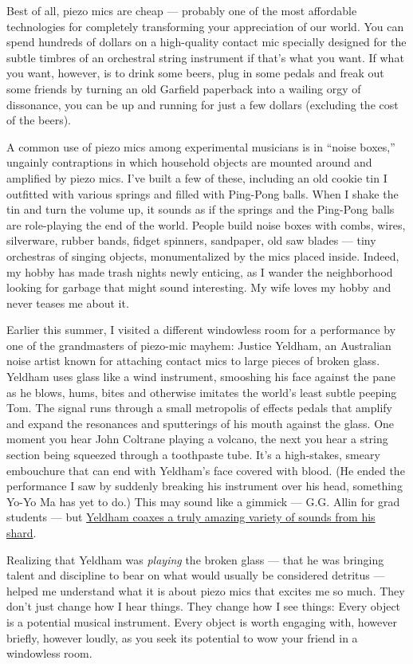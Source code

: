 Best of all, piezo mics are cheap --- probably one of the most
affordable technologies for completely transforming your appreciation of
our world. You can spend hundreds of dollars on a high-quality contact
mic specially designed for the subtle timbres of an orchestral string
instrument if that's what you want. If what you want, however, is to
drink some beers, plug in some pedals and freak out some friends by
turning an old Garfield paperback into a wailing orgy of dissonance, you
can be up and running for just a few dollars (excluding the cost of the
beers).

A common use of piezo mics among experimental musicians is in ``noise
boxes,'' ungainly contraptions in which household objects are mounted
around and amplified by piezo mics. I've built a few of these, including
an old cookie tin I outfitted with various springs and filled with
Ping-Pong balls. When I shake the tin and turn the volume up, it sounds
as if the springs and the Ping-Pong balls are role-playing the end of
the world. People build noise boxes with combs, wires, silverware,
rubber bands, fidget spinners, sandpaper, old saw blades --- tiny
orchestras of singing objects, monumentalized by the mics placed inside.
Indeed, my hobby has made trash nights newly enticing, as I wander the
neighborhood looking for garbage that might sound interesting. My wife
loves my hobby and never teases me about it.

Earlier this summer, I visited a different windowless room for a
performance by one of the grandmasters of piezo-mic mayhem: Justice
Yeldham, an Australian noise artist known for attaching contact mics to
large pieces of broken glass. Yeldham uses glass like a wind instrument,
smooshing his face against the pane as he blows, hums, bites and
otherwise imitates the world's least subtle peeping Tom. The signal runs
through a small metropolis of effects pedals that amplify and expand the
resonances and sputterings of his mouth against the glass. One moment
you hear John Coltrane playing a volcano, the next you hear a string
section being squeezed through a toothpaste tube. It's a high-stakes,
smeary embouchure that can end with Yeldham's face covered with blood.
(He ended the performance I saw by suddenly breaking his instrument over
his head, something Yo-Yo Ma has yet to do.) This may sound like a
gimmick --- G.G. Allin for grad students --- but
\href{http://dualplover.com/yeldham/}{Yeldham coaxes a truly amazing
variety of sounds from his shard}.

Realizing that Yeldham was \emph{playing} the broken glass --- that he
was bringing talent and discipline to bear on what would usually be
considered detritus --- helped me understand what it is about piezo mics
that excites me so much. They don't just change how I hear things. They
change how I see things: Every object is a potential musical instrument.
Every object is worth engaging with, however briefly, however loudly, as
you seek its potential to wow your friend in a windowless room.

